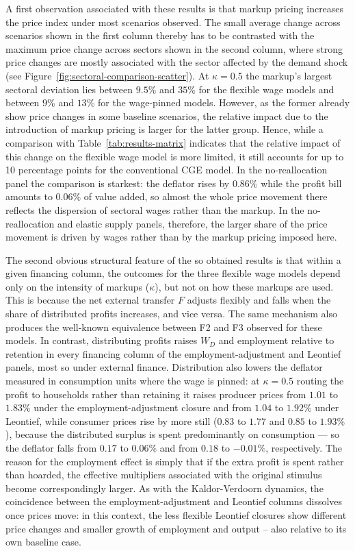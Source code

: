 

A first observation associated with these results is that markup pricing increases the price index under most scenarios observed. The small average change across scenarios shown in the first column thereby has to be contrasted with the maximum price change across sectors shown in the second column, where strong price changes are mostly associated with the sector affected by the demand shock (see Figure~\ref{fig:sectoral-comparison-scatter}). At $\kappa = 0.5$ the markup's largest sectoral deviation lies between $9.5\%$ and $35\%$ for the flexible wage models and between $9\%$ and $13\%$ for the wage-pinned models. However, as the former already show price changes in some baseline scenarios, the relative impact due to the introduction of markup pricing is larger for the latter group. Hence, while a comparison with Table~\ref{tab:results-matrix} indicates that the relative impact of this change on the flexible wage model is more limited, it still accounts for up to 10 percentage points for the conventional CGE model. In the no-reallocation panel the comparison is starkest: the deflator rises by $0.86\%$ while the profit bill amounts to $0.06\%$ of value added, so almost the whole price movement there reflects the dispersion of sectoral wages rather than the markup. In the no-reallocation and elastic supply panels, therefore, the larger share of the price movement is driven by wages rather than by the markup pricing imposed here.

The second obvious structural feature of the so obtained results is that within a given financing column, the outcomes for the three flexible wage models depend only on the intensity of markups ($\kappa$), but not on how these markups are used. This is because the net external transfer $F$ adjusts flexibly and falls when the share of distributed profits increases, and vice versa. The same mechanism also produces the well-known equivalence between F2 and F3 observed for these models. In contrast, distributing profits raises $W_D$ and employment relative to retention in every financing column of the employment-adjustment and Leontief panels, most so under external finance. Distribution also lowers the deflator measured in consumption units where the wage is pinned: at $\kappa = 0.5$ routing the profit to households rather than retaining it raises producer prices from $1.01$ to $1.83\%$ under the employment-adjustment closure and from $1.04$ to $1.92\%$ under Leontief, while consumer prices rise by more still ($0.83$ to $1.77$ and $0.85$ to $1.93\%$), because the distributed surplus is spent predominantly on consumption --- so the deflator falls from $0.17$ to $0.06\%$ and from $0.18$ to $-0.01\%$, respectively. The reason for the employment effect is simply that if the extra profit is spent rather than hoarded, the effective multipliers associated with the original stimulus become correspondingly larger. As with the Kaldor-Verdoorn dynamics, the coincidence between the employment-adjustment and Leontief columns dissolves once prices move: in this context, the less flexible Leontief closures show different price changes and smaller growth of employment and output -- also relative to its own baseline case.


